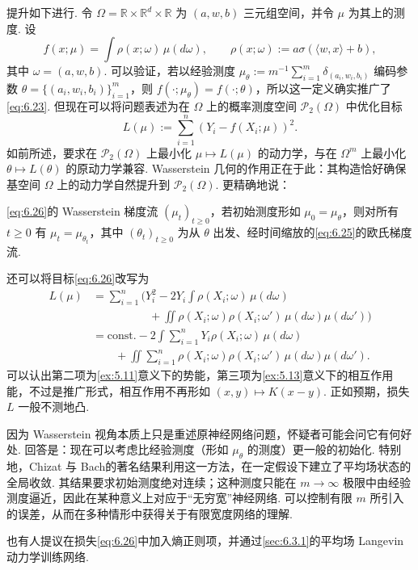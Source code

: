 提升如下进行. 令 $\Omega=\mathbb R\times\mathbb R^d\times\mathbb R$ 为 $(a,w,b)$ 三元组空间，并令 $\mu$ 为其上的测度. 设
$$
f(x;\mu)=\int\rho(x;\omega)\,\mu(d\omega),\qquad
\rho(x;\omega):=a\sigma(\langle w,x\rangle+b),
$$
其中 $\omega=(a,w,b)$. 可以验证，若以经验测度 $\mu_\theta:=m^{-1}\sum_{i=1}^m\delta_{(a_i,w_i,b_i)}$ 编码参数 $\theta=\{(a_i,w_i,b_i)\}_{i=1}^m$，则 $f(\cdot;\mu_\theta)=f(\cdot;\theta)$，所以这一定义确实推广了\eqref{eq:6.23}. 但现在可以将问题表述为在 $\Omega$ 上的概率测度空间 $\mathcal P_2(\Omega)$ 中优化目标
\begin{equation}\label{eq:6.26}
L(\mu):=\sum_{i=1}^n(Y_i-f(X_i;\mu))^2.
\end{equation}
如前所述，要求在 $\mathcal P_2(\Omega)$ 上最小化 $\mu\mapsto L(\mu)$ 的动力学，与在 $\Omega^m$ 上最小化 $\theta\mapsto L(\theta)$ 的原动力学兼容. Wasserstein 几何的作用正在于此：其构造恰好确保基空间 $\Omega$ 上的动力学自然提升到 $\mathcal P_2(\Omega)$. 更精确地说：

\begin{proposition}\label{prop:6.16}
\eqref{eq:6.26}的 Wasserstein 梯度流 $(\mu_t)_{t\geq0}$，若初始测度形如 $\mu_0=\mu_\theta$，则对所有 $t\geq0$ 有 $\mu_t=\mu_{\theta_t}$，其中 $(\theta_t)_{t\geq0}$ 为从 $\theta$ 出发、经时间缩放的\eqref{eq:6.25}的欧氏梯度流.
\end{proposition}

还可以将目标\eqref{eq:6.26}改写为
$$
\begin{aligned}
L(\mu)
&=\sum_{i=1}^n\Biggl(Y_i^2-2Y_i\int\rho(X_i;\omega)\,\mu(d\omega)\\
&\hspace{5em}+\iint\rho(X_i;\omega)\rho(X_i;\omega')\,\mu(d\omega)\mu(d\omega')\Biggr)\\
&=\mathrm{const.}-2\int\sum_{i=1}^nY_i\rho(X_i;\omega)\,\mu(d\omega)\\
&\qquad+\iint\sum_{i=1}^n\rho(X_i;\omega)\rho(X_i;\omega')\,\mu(d\omega)\mu(d\omega').
\end{aligned}
$$
可以认出第二项为\autoref{ex:5.11}意义下的势能，第三项为\autoref{ex:5.13}意义下的相互作用能，不过是推广形式，相互作用不再形如 $(x,y)\mapsto K(x-y)$. 正如预期，损失 $L$ 一般不测地凸.

因为 Wasserstein 视角本质上只是重述原神经网络问题，怀疑者可能会问它有何好处. 回答是：现在可以考虑比经验测度（形如 $\mu_\theta$ 的测度）更一般的初始化. 特别地，Chizat 与 Bach\cite{ref83}的著名结果利用这一方法，在一定假设下建立了平均场状态的全局收敛. 其结果要求初始测度绝对连续；这种测度只能在 $m\to\infty$ 极限中由经验测度逼近，因此在某种意义上对应于“无穷宽”神经网络. 可以控制有限 $m$ 所引入的误差，从而在多种情形中获得关于有限宽度网络的理解\cite{ref1,ref2,ref227}.

也有人提议在损失\eqref{eq:6.26}中加入熵正则项，并通过\autoref{sec:6.3.1}的平均场 Langevin 动力学训练网络\cite{ref67,ref296,ref303}.
